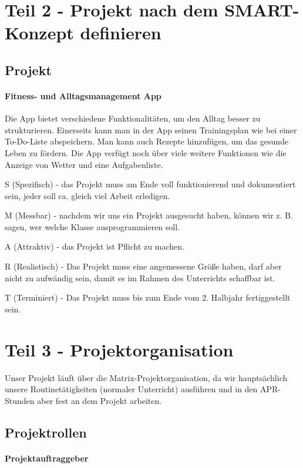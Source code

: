 \documentclass[ngerman]{report}
\begin{document}
\section{Teil 2 - Projekt nach dem SMART-Konzept definieren}

\subsection{Projekt}

\paragraph{Fitness- und Alltagsmanagement App}

Die App bietet verschiedene Funktionalitäten, um den Alltag besser zu
strukturieren. Einerseits kann man in der App seinen Trainingsplan wie
bei einer To-Do-Liste abspeichern. Man kann auch Rezepte hinzufügen, um
das gesunde Leben zu fördern. Die App verfügt noch über viele weitere
Funktionen wie die Anzeige von Wetter und eine Aufgabenliste.

S (Spezifisch) - das Projekt muss am Ende voll funktionierend und
dokumentiert sein, jeder soll ca. gleich viel Arbeit erledigen.

M (Messbar) - nachdem wir uns ein Projekt ausgesucht haben, können wir
z. B. sagen, wer welche Klasse ausprogrammieren soll.

A (Attraktiv) - das Projekt ist Pflicht zu machen.

R (Realistisch) - Das Projekt muss eine angemessene Größe haben, darf
aber nicht zu aufwändig sein, damit es im Rahmen des Unterrichts
schaffbar ist.

T (Terminiert) - Das Projekt muss bis zum Ende vom 2. Halbjahr
fertiggestellt sein.

\section{Teil 3 - Projektorganisation}

Unser Projekt läuft über die Matrix-Projektorganisation, da wir
hauptsächlich unsere Routinetätigkeiten (normaler Unterricht) ausführen
und in den APR-Stunden aber fest an dem Projekt arbeiten.

\subsection{Projektrollen}

\paragraph{Projektauftraggeber}
\end{document}
